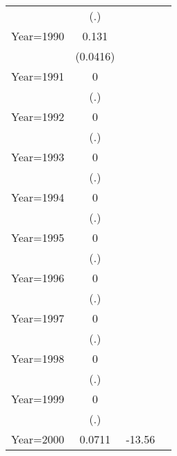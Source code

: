 \begin{table}[htbp]
\begin{tabular}{l*{3}{c}}
                &      (.)         &                  &                  \\
\addlinespace
Year=1990       &    0.131\sym{**} &                  &                  \\
                & (0.0416)         &                  &                  \\
\addlinespace
Year=1991       &        0         &                  &                  \\
                &      (.)         &                  &                  \\
\addlinespace
Year=1992       &        0         &                  &                  \\
                &      (.)         &                  &                  \\
\addlinespace
Year=1993       &        0         &                  &                  \\
                &      (.)         &                  &                  \\
\addlinespace
Year=1994       &        0         &                  &                  \\
                &      (.)         &                  &                  \\
\addlinespace
Year=1995       &        0         &                  &                  \\
                &      (.)         &                  &                  \\
\addlinespace
Year=1996       &        0         &                  &                  \\
                &      (.)         &                  &                  \\
\addlinespace
Year=1997       &        0         &                  &                  \\
                &      (.)         &                  &                  \\
\addlinespace
Year=1998       &        0         &                  &                  \\
                &      (.)         &                  &                  \\
\addlinespace
Year=1999       &        0         &                  &                  \\
                &      (.)         &                  &                  \\
\addlinespace
Year=2000       &   0.0711\sym{**} &   -13.56\sym{***}&                  \\

\end{tabular}
\end{table}
